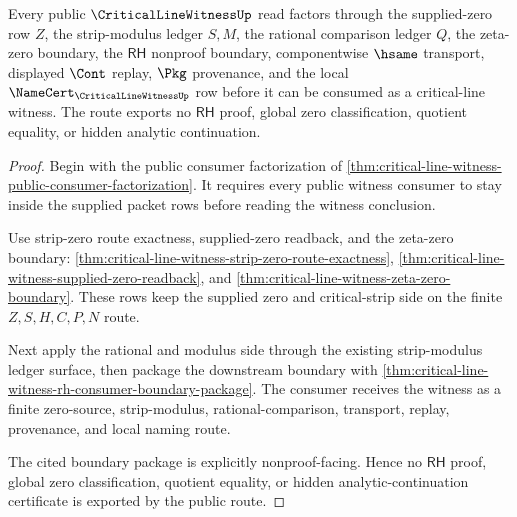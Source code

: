 \begin{theorem}
\label{thm:critical-line-witness-public-route}
Every public $\CriticalLineWitnessUp$ read factors through the supplied-zero row $Z$, the strip-modulus ledger $S,M$, the rational comparison ledger $Q$, the zeta-zero boundary, the $\mathsf{RH}$ nonproof boundary, componentwise $\hsame$ transport, displayed $\Cont$ replay, $\Pkg$ provenance, and the local $\NameCert_{\CriticalLineWitnessUp}$ row before it can be consumed as a critical-line witness. The route exports no $\mathsf{RH}$ proof, global zero classification, quotient equality, or hidden analytic continuation.
\end{theorem}
\begin{proof}
Begin with the public consumer factorization of \autoref{thm:critical-line-witness-public-consumer-factorization}. It requires every public witness consumer to stay inside the supplied packet rows before reading the witness conclusion.

Use strip-zero route exactness, supplied-zero readback, and the zeta-zero boundary: \autoref{thm:critical-line-witness-strip-zero-route-exactness}, \autoref{thm:critical-line-witness-supplied-zero-readback}, and \autoref{thm:critical-line-witness-zeta-zero-boundary}. These rows keep the supplied zero and critical-strip side on the finite $Z,S,H,C,P,N$ route.

Next apply the rational and modulus side through the existing strip-modulus ledger surface, then package the downstream boundary with \autoref{thm:critical-line-witness-rh-consumer-boundary-package}. The consumer receives the witness as a finite zero-source, strip-modulus, rational-comparison, transport, replay, provenance, and local naming route.

The cited boundary package is explicitly nonproof-facing. Hence no $\mathsf{RH}$ proof, global zero classification, quotient equality, or hidden analytic-continuation certificate is exported by the public route.
\end{proof}
